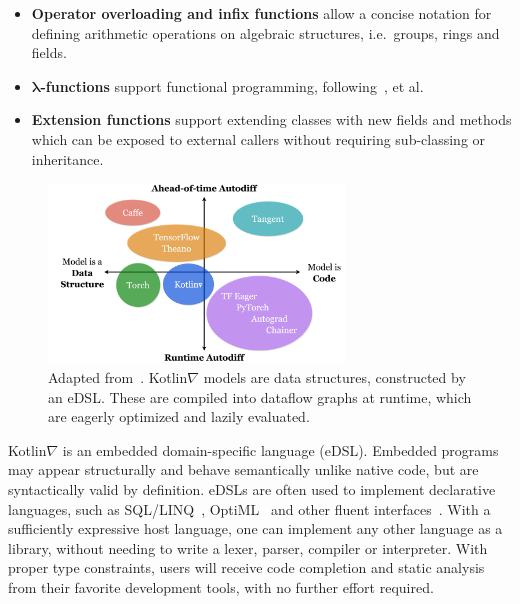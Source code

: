 \documentclass{article}
\begin{document}
\begin{itemize}
    \item \textbf{Operator overloading and infix functions} allow a concise notation for defining arithmetic operations on algebraic structures, i.e.\ groups, rings and fields.~\citep{niculescu2011using}
    \item \textbf{$\mathbf{\lambda}$-functions} support functional programming, following~\citet{pearlmutter2008reverse, pearlmutter2008using, siskind2008nesting, elliott2009beautiful, elliott2018simple}, et al.
    \item \textbf{Extension functions} support extending classes with new fields and methods which can be exposed to external callers without requiring sub-classing or inheritance.
\end{itemize}

\begin{figure}
    \centering
    \includegraphics[width=0.70\textwidth]{../figures/kotlingrad_diagram.png}
    \vspace{10pt}\caption{Adapted from~\citet{van2018tangent}. Kotlin$\nabla$ models are data structures, constructed by an eDSL. These are compiled into dataflow graphs at runtime, which are eagerly optimized and lazily evaluated.}
    \label{fig:kotlingrad_digram}
\end{figure}

Kotlin$\nabla$ is an embedded domain-specific language (eDSL). Embedded programs may appear structurally and behave semantically unlike native code, but are syntactically valid by definition. eDSLs are often used to implement declarative languages, such as SQL/LINQ~\citep{meijer2006linq}, OptiML~\citep{sujeeth2011optiml} and other fluent interfaces~\citep{fowler05fluent}. With a sufficiently expressive host language, one can implement any other language as a library, without needing to write a lexer, parser, compiler or interpreter. With proper type constraints, users will receive code completion and static analysis from their favorite development tools, with no further effort required.
\end{document}
